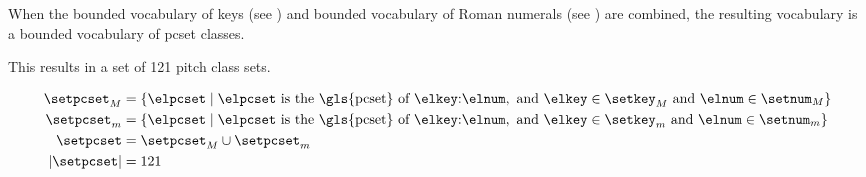 When the bounded vocabulary of keys (see
) and bounded vocabulary
of Roman numerals (see
) are combined, the
resulting vocabulary is a bounded vocabulary of \gls{pcset}
classes.

This results in a set of 121 pitch class sets.

\begin{equation}
    \begin{split}
    \setpcset_M &= \{ \elpcset \mid \elpcset \text{ is the \gls{pcset} of }
    \elkey\text{:}\elnum, \text{ and }
    \elkey \in \setkey_M \text{ and } \elnum \in \setnum_M  \} \\
    \setpcset_m &= \{ \elpcset \mid \elpcset \text{ is the \gls{pcset} of }
    \elkey\text{:}\elnum, \text{ and }
    \elkey \in \setkey_m \text{ and } \elnum \in \setnum_m  \} \\
    \setpcset &= \setpcset_M \cup \setpcset_m \\
    | \setpcset | &= 121 \\    
    \end{split}
\end{equation}
